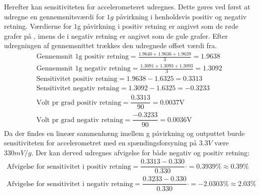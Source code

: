 \noindent Herefter kan sensitiviteten for accelerometeret udregnes. Dette gøres ved først at udregne en gennemsnitsværdi for $1g$ påvirkning i henholdsvis positiv og negativ retning. Værdierne for $1$g påvirkning i positiv retning er angivet som de røde grafer på , imens de i negativ retning er angivet som de gule grafer. Efter udregningen af gennemsnittet trækkes den udregnede offset værdi fra.
\
\begin{align}\label{taeskelvaerdi_pr_grad}
	\text{Gennemsnit 1g positiv retning} = \frac{1.9640 + 1.9636 + 1.9639}{3} = 1.9638 \\
	\text{Gennemsnit 1g negativ retning} = \frac{1.3091 + 1.3093 + 1.3093}{3} = 1.3092 \\
	\text{Sensitivitet positiv retning} = 1.9638 - 1.6325 = 0.3313 \\
	\text{Sensitivitet negativ retning} = 1.3092 - 1.6325 = -0.3233 \\
	\text{Volt pr grad positiv retning} = \dfrac{0.3313}{90} = 0.0037\text{V} \\
	\text{Volt pr grad negativ retning} = \dfrac{-0.3233}{90} = 0.0036\text{V}
\end{align}
\noindent Da der findes en lineær sammenhæng imellem g påvirkning og outputtet burde sensitiviteten for accelerometret med en spændingsforsyning på $3.3V$ være $330mV/g$. Der kan derved udregnes afvigelse for både negativ og positiv retning:
\begin{align}
	\text{Afvigelse for sensitivitet i positiv retning} = \dfrac{0.3313 - 0.330}{0.330} \cdot = 0.3939\% \approx 0.39\% \\
	\text{Afvigelse for sensitivitet i negativ retning} = \dfrac{0.3233 - 0.330}{0.330} \cdot = -2.0303\% \approx 2.03\%
\end{align}

